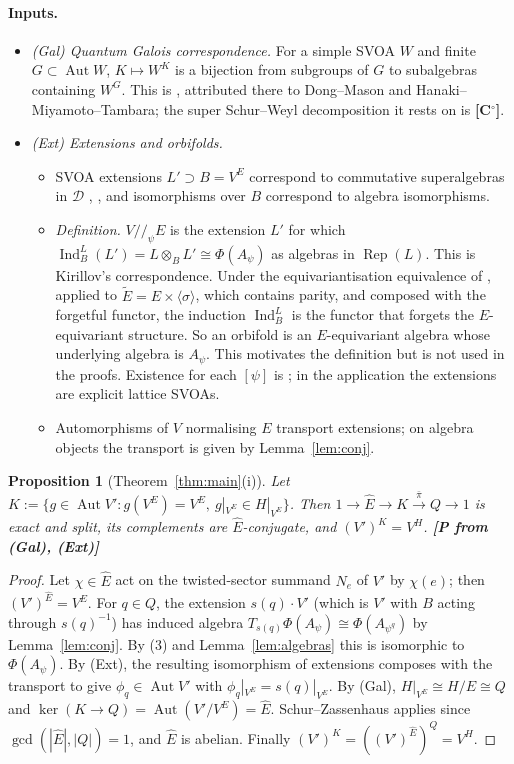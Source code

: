 \documentclass[11pt]{article}
\newtheorem{proposition}[theorem]{Proposition}
\theoremstyle{definition}
\newcommand{\cD}{\mathcal D}
\newcommand{\Rep}{\operatorname{Rep}}
\newcommand{\Ind}{\operatorname{Ind}}
\newcommand{\Aut}{\operatorname{Aut}}
\newcommand{\Ehat}{\widehat E}
\newcommand{\st}[1]{\textbf{[#1]}}
\begin{document}
\paragraph{Inputs.}
\begin{itemize}[nosep]
\item \emph{(Gal) Quantum Galois correspondence.} For a simple SVOA $W$ and finite
$G\subset\Aut W$, $K\mapsto W^K$ is a bijection from subgroups of $G$ to subalgebras containing
$W^G$. This is \cite[Thm~6.2]{DJX}, attributed there to Dong--Mason and Hanaki--Miyamoto--Tambara;
the super Schur--Weyl decomposition it rests on is \cite[Thm~3.2]{McR19} \st{C$^\circ$}.
\item \emph{(Ext) Extensions and orbifolds.}
\begin{itemize}[nosep]
\item SVOA extensions $L'\supset B=V^E$ correspond to commutative superalgebras in $\cD$
\cite[Thm~3.42]{CKM}, \cite[Thm~3.2]{HKL}, and isomorphisms over $B$ correspond to algebra
isomorphisms.
\item \emph{Definition.} $V/\!/_\psi E$ is the extension $L'$ for which
$\Ind_B^L(L')=L\otimes_BL'\cong\Phi(A_\psi)$ as algebras in $\Rep(L)$. This is Kirillov's
correspondence. Under the equivariantisation equivalence of \cite[Thm~4.17]{McR}, applied to
$\widetilde E=E\times\langle\sigma\rangle$, which contains parity, and composed with the forgetful
functor, the induction $\Ind_B^L$ is the functor that forgets the $E$-equivariant structure. So an
orbifold is an $E$-equivariant algebra whose underlying algebra is $A_\psi$. This motivates the
definition but is not used in the proofs. Existence for each $[\psi]$ is \cite[Thm~4.2]{GJF}; in the application the
extensions are explicit lattice SVOAs.
\item Automorphisms of $V$ normalising $E$ transport extensions; on algebra objects the transport
is given by Lemma~\ref{lem:conj}.
\end{itemize}
\end{itemize}

\begin{proposition}[Theorem~\ref{thm:main}(i)]\label{prop:K}
Let $K:=\{g\in\Aut V': g(V^E)=V^E,\ g|_{V^E}\in H|_{V^E}\}$. Then
$1\to\Ehat\to K\xrightarrow{\bar\pi}Q\to1$ is exact and split, its complements are
$\Ehat$-conjugate, and $(V')^K=V^H$. \st{P from (Gal), (Ext)}
\end{proposition}
\begin{proof}
Let $\chi\in\Ehat$ act on the twisted-sector summand $N_e$ of $V'$ by $\chi(e)$; then
$(V')^{\Ehat}=V^E$. For $q\in Q$, the extension $s(q)\cdot V'$ (which is $V'$ with $B$ acting through
$s(q)^{-1}$) has induced algebra $T_{s(q)}\Phi(A_\psi)\cong\Phi(A_{\psi^q})$ by
Lemma~\ref{lem:conj}. By (3) and Lemma~\ref{lem:algebras} this is isomorphic to $\Phi(A_\psi)$. By
(Ext), the resulting isomorphism of extensions composes with the transport to give
$\phi_q\in\Aut V'$ with $\phi_q|_{V^E}=s(q)|_{V^E}$. By (Gal), $H|_{V^E}\cong H/E\cong Q$ and
$\ker(K\to Q)=\Aut(V'/V^E)=\Ehat$. Schur--Zassenhaus applies since $\gcd(|\Ehat|,|Q|)=1$, and $\Ehat$
is abelian. Finally $(V')^K=((V')^{\Ehat})^{Q}=V^H$.
\end{proof}
\end{document}
